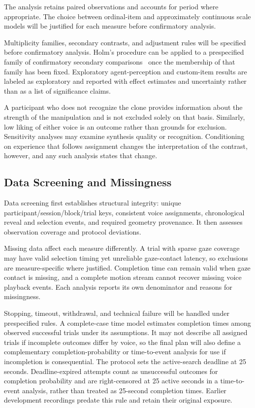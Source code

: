 The analysis retains paired observations and accounts for period where appropriate. The choice between ordinal-item and approximately continuous scale models will be justified for each measure before confirmatory analysis.

Multiplicity families, secondary contrasts, and adjustment rules will be specified before confirmatory analysis. Holm's procedure can be applied to a prespecified family of confirmatory secondary comparisons~\cite{holm1979simple} once the membership of that family has been fixed. Exploratory agent-perception and custom-item results are labeled as exploratory and reported with effect estimates and uncertainty rather than as a list of significance claims.

A participant who does not recognize the clone provides information about the strength of the manipulation and is not excluded solely on that basis. Similarly, low liking of either voice is an outcome rather than grounds for exclusion. Sensitivity analyses may examine synthesis quality or recognition. Conditioning on experience that follows assignment changes the interpretation of the contrast, however, and any such analysis states that change.

\subsection{Data Screening and Missingness}
Data screening first establishes structural integrity: unique participant/session/block/trial keys, consistent voice assignments, chronological reveal and selection events, and required geometry provenance. It then assesses observation coverage and protocol deviations.

Missing data affect each measure differently. A trial with sparse gaze coverage may have valid selection timing yet unreliable gaze-contact latency, so exclusions are measure-specific where justified. Completion time can remain valid when gaze contact is missing, and a complete motion stream cannot recover missing voice playback events. Each analysis reports its own denominator and reasons for missingness.

Stopping, timeout, withdrawal, and technical failure will be handled under prespecified rules. A complete-case time model estimates completion times among observed successful trials under its assumptions. It may not describe all assigned trials if incomplete outcomes differ by voice, so the final plan will also define a complementary completion-probability or time-to-event analysis for use if incompletion is consequential. The protocol sets the active-search deadline at 25 seconds. Deadline-expired attempts count as unsuccessful outcomes for completion probability and are right-censored at 25 active seconds in a time-to-event analysis, rather than treated as 25-second completion times. Earlier development recordings predate this rule and retain their original exposure.

